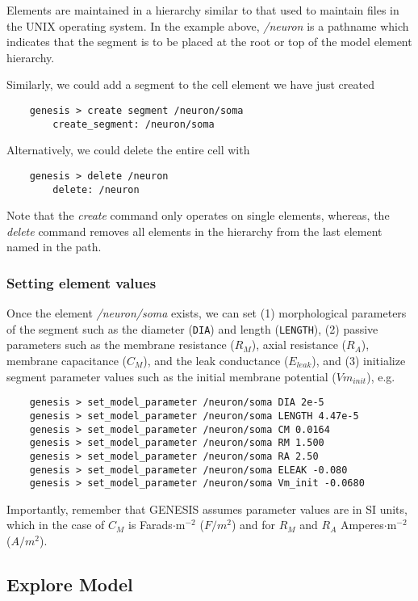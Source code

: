 \documentclass[12pt]{article}
\begin{document}
Elements are maintained in a hierarchy similar to that used to maintain files in the UNIX operating system. In the example above, {\it /neuron} is a pathname which indicates that the segment is to be placed at the root or top of the model element hierarchy.

Similarly, we could add a segment to the cell element we have just created
\begin{verbatim}
    genesis > create segment /neuron/soma
        create_segment: /neuron/soma
\end{verbatim}
Alternatively, we could delete the entire cell with 
\begin{verbatim}
    genesis > delete /neuron
        delete: /neuron
\end{verbatim}

Note that the {\it create} command only operates on single elements, whereas, the {\it delete} command removes all elements in the hierarchy from the last element named in the path.

\subsubsection*{Setting element values}

Once the element {\it /neuron/soma} exists, we can set (1) morphological  parameters of the segment such as the diameter ({\tt DIA}) and length ({\tt LENGTH}), (2) passive parameters such as  the membrane resistance ($R_M$), axial resistance ($R_A$), membrane capacitance ($C_M$), and the leak conductance ($E_{leak}$), and (3) initialize segment parameter values such as the initial membrane potential ($Vm_{init}$), e.g.
\begin{verbatim}
    genesis > set_model_parameter /neuron/soma DIA 2e-5
    genesis > set_model_parameter /neuron/soma LENGTH 4.47e-5
    genesis > set_model_parameter /neuron/soma CM 0.0164
    genesis > set_model_parameter /neuron/soma RM 1.500
    genesis > set_model_parameter /neuron/soma RA 2.50
    genesis > set_model_parameter /neuron/soma ELEAK -0.080
    genesis > set_model_parameter /neuron/soma Vm_init -0.0680
\end{verbatim}

Importantly, remember that GENESIS assumes parameter values are in SI units, which in the case of $C_M$ is Farads$\cdot$m$^{-2}$ ($F/m^2$) and for $R_M$ and $R_A$ Amperes$\cdot$m$^{-2}$ ($A/m^2$).

\subsection*{Explore Model}
\end{document}

